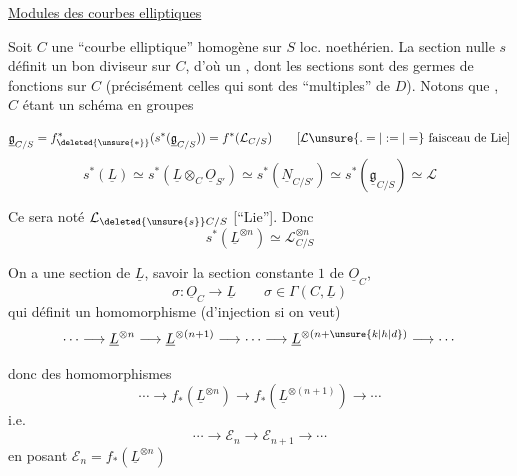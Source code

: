 \uline{Modules des courbes elliptiques}

Soit $C$ une ``courbe elliptique'' homogène sur $S$ loc. noethérien. La section nulle $s$ définit un bon diviseur  sur $C$, d'où un , dont les  sections sont des  germes de fonctions sur $C$ (précisément celles qui sont des ``multiples'' de $D$). Notons que , $C$ étant un schéma en groupes


\[
\underline{\mathfrak g}_{C/S}=f^{*}_{\deleted{\unsure{*}}}(s^*(\underline{\mathfrak g}_{C/S}))=f^*(\mathcal L_{C/S})\qquad [\mathcal L\unsure{.=|:=|=}\text{ faisceau de Lie}]
\]
\[
s^*(\underline L)\simeq s^*(\underline L\otimes_C\underline O_{S'})\simeq s^*(\underline N_{C/S'})\simeq s^*(\underline{\mathfrak g}_{C/S})\simeq\mathcal L
\]

Ce  sera noté $\mathcal L_{\deleted{\unsure{s}}C/S}$ [``Lie'']. Donc
\[
s^*(\underline L^{\otimes n})\simeq\mathcal L_{C/S}^{\otimes n}
\]

On a une section  de $\underline L$, savoir la section constante $1$ de $\underline O_C$,
\[
\sigma:\underline O_C\longrightarrow\underline L\qquad \sigma\in\Gamma(C,\underline L)
\]
qui définit un homomorphisme (d'injection si on veut)
\[
\cdots\longrightarrow\underline L^{\otimes n}\longrightarrow\underline L^{\otimes(n+1)}
\longrightarrow\cdots\longrightarrow\underline L^{\otimes(n+\unsure{k|h|d})}\longrightarrow\cdots
\]

donc  des homomorphismes
\[
\cdots\longrightarrow f_*(\underline L^{\otimes n})\longrightarrow f_*(\underline L^{\otimes(n+1)})\longrightarrow\cdots
\]
i.e.
\[
\cdots\longrightarrow\mathcal E_n\longrightarrow\mathcal E_{n+1}\longrightarrow\cdots
\]
en posant \(\mathcal E_n=f_*(\underline L^{\otimes n})\)
